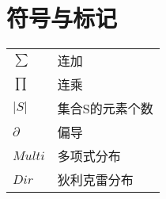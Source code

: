 \chapter{符号与标记}
\label{chap:symbol}

\begin{table}[!h]
\centering
\begin{tabular}{p{3.5cm}p{3.5cm}} 

$\sum$    & 连加 \\

$\prod$    & 连乘 \\

$|S|$       & 集合S的元素个数\\

$\partial$  & 偏导 \\

$Multi$  & 多项式分布 \\

$Dir$  & 狄利克雷分布 \\

\end{tabular}
\end{table}

